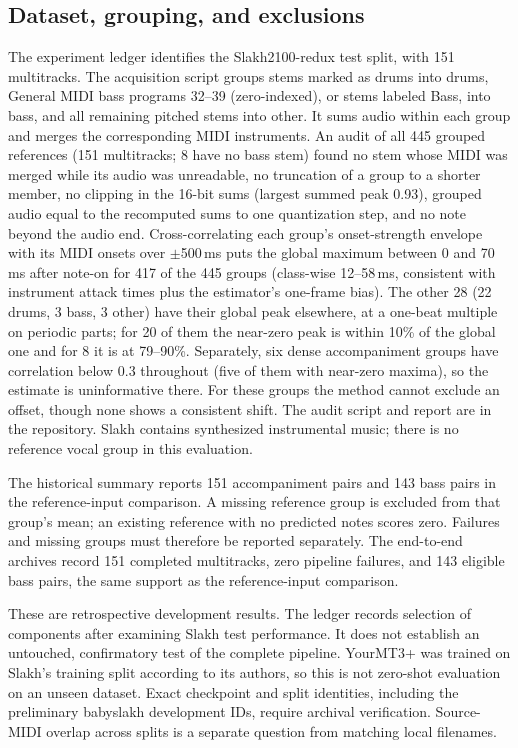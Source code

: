\documentclass[11pt]{article}
\begin{document}
\subsection{Dataset, grouping, and exclusions}
The experiment ledger identifies the Slakh2100-redux test split, with 151
multitracks. The acquisition script groups stems marked as drums into drums,
General MIDI bass programs 32--39 (zero-indexed), or stems labeled Bass, into bass,
and all remaining pitched stems into other. It sums audio within each group and
merges the corresponding MIDI instruments. An audit of all 445 grouped references
(151 multitracks; 8 have no bass stem) found no stem whose MIDI was merged while its
audio was unreadable, no truncation of a group to a shorter member, no clipping in
the 16-bit sums (largest summed peak 0.93), grouped audio equal to the recomputed
sums to one quantization step, and no note beyond the audio end. Cross-correlating
each group's onset-strength envelope with its MIDI onsets over $\pm$500\,ms puts
the global maximum between 0 and 70\,ms after note-on for 417 of the 445 groups
(class-wise 12--58\,ms, consistent with instrument attack times plus the
estimator's one-frame bias). The other 28 (22 drums, 3 bass, 3 other) have their
global peak elsewhere, at a one-beat multiple on periodic parts; for 20 of them the
near-zero peak is within 10\% of the global one and for 8 it is at 79--90\%.
Separately, six dense accompaniment groups have correlation below 0.3 throughout
(five of them with near-zero maxima), so the estimate is uninformative there. For
these groups the method cannot exclude an offset, though none shows a consistent
shift. The audit script and report are in the repository. Slakh contains synthesized instrumental
music; there is no reference vocal group in this evaluation.

The historical summary reports 151 accompaniment pairs and 143 bass pairs in the
reference-input comparison. A missing reference group is excluded from that
group's mean; an existing reference with no predicted notes scores zero. Failures
and missing groups must therefore be reported separately. The end-to-end archives
record 151 completed multitracks, zero pipeline failures, and 143 eligible bass
pairs, the same support as the reference-input comparison.

These are retrospective development results. The ledger records selection of
components after examining Slakh test performance. It does not establish an
untouched, confirmatory test of the complete pipeline. YourMT3+ was trained on
Slakh's training split according to its authors, so this is not zero-shot evaluation
on an unseen dataset. Exact checkpoint and split identities, including the
preliminary babyslakh development IDs, require archival verification. Source-MIDI
overlap across splits is a separate question from matching local filenames.
\end{document}
